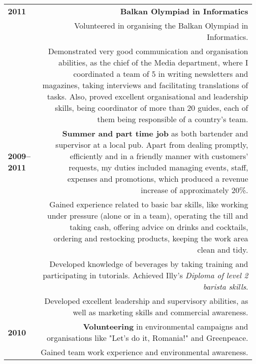 \documentclass[11pt,a4paper]{article}
\begin{document}
\section*{}
\begin{tabular}{LR}
\bf 2011&\bf Balkan Olympiad in Informatics\\
&Volunteered in organising the Balkan Olympiad in Informatics.\vspace{5pt}\\
&Demonstrated very good communication and organisation abilities, as the chief of the Media department, where I coordinated a team of 5 in writing newsletters and magazines, taking interviews and facilitating translations of tasks. Also, proved excellent organisational and leadership skills, being coordinator of more than 20 guides, each of them being responsible of a country's team.\vspace{5pt}\\
\bf 2009--2011&\textbf{Summer and part time job} as both bartender and supervisor at a local pub. Apart from dealing promptly, efficiently and in a friendly manner with customers' requests, my duties included managing events, staff, expenses and promotions, which produced a revenue increase of approximately 20\%. \vspace{5pt}\\
&Gained experience related to basic bar skills, like working under pressure (alone or in a team), operating the till and taking cash, offering advice on drinks and cocktails, ordering and restocking products, keeping the work area clean and tidy. \vspace{5pt}\\
&Developed knowledge of beverages by taking training and participating in tutorials. Achieved Illy's \textit{Diploma of level 2 barista skills}.\vspace{5pt}\\
&Developed excellent leadership and supervisory abilities, as well as marketing skills and commercial awareness.\vspace{5pt}\\
\bf 2010&\textbf{Volunteering} in environmental campaigns and organisations like "Let's do it, Romania!" and Greenpeace.\vspace{5pt}\\
&Gained team work experience and environmental awareness.\vspace{5pt}\\

\end{tabular}
\end{document}
